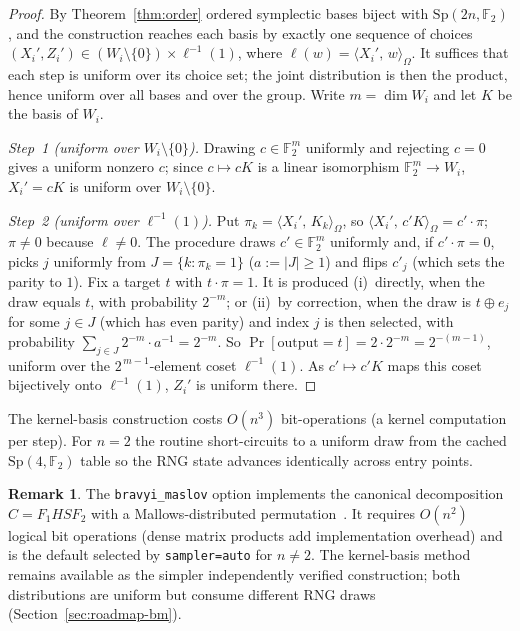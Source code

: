\documentclass[11pt]{article}
\theoremstyle{definition}
\newtheorem{remark}[definition]{Remark}
\theoremstyle{plain}
\newcommand{\F}{\mathbb{F}}
\newcommand{\Sp}{\mathrm{Sp}}
\newcommand{\sympprod}[2]{\langle #1,\, #2\rangle_{\Omega}}
\begin{document}
\begin{proof}
By Theorem~\ref{thm:order} ordered symplectic bases biject with $\Sp(2n,\F_2)$,
and the construction reaches each basis by exactly one sequence of choices
$(X_i',Z_i')\in(W_i\setminus\{0\})\times\ell^{-1}(1)$, where
$\ell(w)=\sympprod{X_i'}{w}$. It suffices that each step is uniform over its
choice set; the joint distribution is then the product, hence uniform over all
bases and over the group. Write $m=\dim W_i$ and let $K$ be the basis of $W_i$.

\emph{Step~1 (uniform over $W_i\setminus\{0\}$).} Drawing $c\in\F_2^{m}$
uniformly and rejecting $c=0$ gives a uniform nonzero $c$; since $c\mapsto cK$ is
a linear isomorphism $\F_2^{m}\to W_i$, $X_i'=cK$ is uniform over
$W_i\setminus\{0\}$.

\emph{Step~2 (uniform over $\ell^{-1}(1)$).} Put $\pi_k=\sympprod{X_i'}{K_k}$, so
$\sympprod{X_i'}{c'K}=c'\!\cdot\!\pi$; $\pi\ne0$ because $\ell\ne0$. The procedure
draws $c'\in\F_2^{m}$ uniformly and, if $c'\!\cdot\!\pi=0$, picks $j$ uniformly
from $J=\{k:\pi_k=1\}$ ($a:=|J|\ge1$) and flips $c'_j$ (which sets the parity to
$1$). Fix a target $t$ with $t\!\cdot\!\pi=1$. It is produced (i)~directly, when
the draw equals $t$, with probability $2^{-m}$; or (ii)~by correction, when the draw
is $t\oplus e_j$ for some $j\in J$ (which has even parity) and index $j$ is then
selected, with probability $\sum_{j\in J}2^{-m}\cdot a^{-1}=2^{-m}$. So
$\Pr[\text{output}=t]=2\cdot2^{-m}=2^{-(m-1)}$, uniform over the
$2^{\,m-1}$-element coset $\ell^{-1}(1)$. As $c'\mapsto c'K$ maps this coset
bijectively onto $\ell^{-1}(1)$, $Z_i'$ is uniform there.
\end{proof}
The kernel-basis construction costs $O(n^3)$ bit-operations (a kernel
computation per step). For $n=2$ the routine short-circuits to a uniform draw
from the cached $\Sp(4,\F_2)$ table so the RNG state advances identically across
entry points.
\begin{remark}
The \texttt{bravyi\_maslov} option implements the canonical decomposition
$C=F_1HSF_2$ with a Mallows-distributed permutation~\cite{BM}. It requires
$O(n^2)$ logical bit operations (dense matrix products add implementation
overhead) and is the default selected by \texttt{sampler=auto} for $n\ne2$.
The kernel-basis method remains available as the simpler independently verified
construction; both distributions are uniform but consume different RNG draws
(Section~\ref{sec:roadmap-bm}).
\end{remark}
\end{document}
